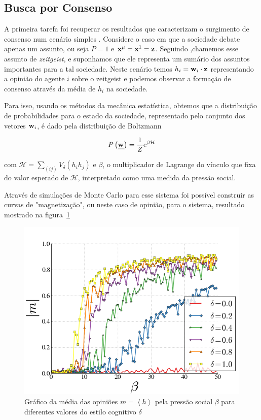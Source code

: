 \documentclass[11pt]{article}
\begin{document}
\subsection{Busca por Consenso}

A primeira tarefa foi recuperar os resultados que caracterizam o
surgimento de consenso num cenário simples \cite{visujeca, Jonatas}.
Considere o caso em
que a sociedade debate apenas um assunto, ou seja $P=1$ e $\bold{x}^{\mu} =
\bold{x}^1 = \displaystyle \bold{z} $.
Seguindo \cite{CaVi},chamemos esse assunto de {\it zeitgeist}, e suponhamos que
ele representa um sumário dos assuntos importantes para a tal sociedade. Neste
cenário temos $h_i = \displaystyle { \ensuremath{\displaystyle \bold{w}_{i} } } \cdot { \ensuremath{\displaystyle \bold{z} } } $ representando a opinião do agente $i$
sobre o zeitgeist e podemos observar a formação de consenso através da média de 
$h_i$ na sociedade.

Para isso, usando os métodos da mecânica estatística, obtemos que a distribuição
de probabilidades para o estado da sociedade, representado pelo conjunto
dos vetores $\displaystyle \bold{w}_{i} $, é dado pela distribuição de Boltzmann

\[P\displaystyle \left(\underline{\displaystyle \bold{w}_{} }\right)=\frac{1}{Z}\mathrm{e}^{\beta \mathcal{H}}\]

com $\mathcal{H}=\sum_{(ij)} V_{\delta}(h_ih_j)$ e $\beta$, o multiplicador de
Lagrange do vínculo que fixa do valor esperado de $\mathcal{H}$, interpretado
como uma medida da pressão social.

Através de simulações de Monte Carlo para esse sistema foi possível construir as
curvas de "magnetização", ou neste caso de opinião, para o sistema, resultado
mostrado na figura~\ref{m-b-d}

\begin{figure}[h!]
  \centering
      \includegraphics[width=1.0\textwidth]{mbd.png}
  \caption{Gráfico da média das opiniões $m=\left<h\right>$ pela pressão social
      $\beta$ para diferentes valores do estilo cognitivo $\delta$}
    \label{m-b-d}
\end{figure}
\end{document}
